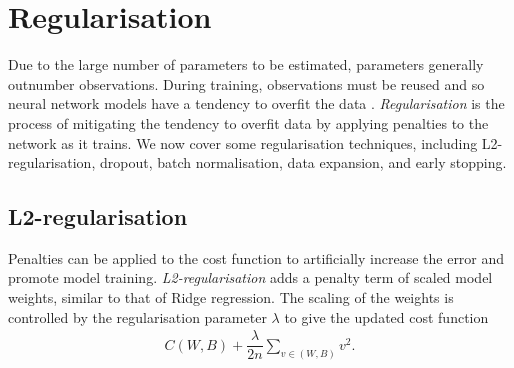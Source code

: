 

\section{Regularisation}\label{nnet-reg}

Due to the large number of parameters to be estimated, parameters generally outnumber observations. During training, observations must be reused and so neural network models have a tendency to overfit the data \citep{Nielson2015}. \textit{Regularisation} is the process of mitigating the tendency to overfit data by applying penalties to the network as it trains. We now cover some regularisation techniques, including L2-regularisation, dropout, batch normalisation, data expansion, and early stopping.

\subsection*{L2-regularisation}\label{nnet-l2reg}


Penalties can be applied to the cost function to artificially increase the error and promote model training. \textit{L2-regularisation} adds a penalty term of scaled model weights, similar to that of Ridge regression. The scaling of the weights is controlled by the regularisation parameter $\lambda$ to give the updated cost function
\begin{align*}
	C(W,B) + \dfrac{\lambda}{2n}\sum_{v\in (W,B)}v^2.
\end{align*}


